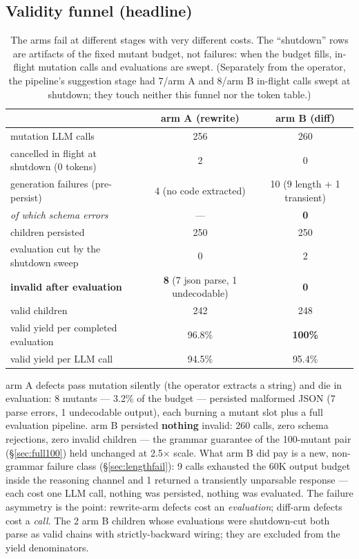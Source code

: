 \documentclass[11pt]{article}
\newcommand{\armA}{\textcolor{bad}{arm A}}
\newcommand{\armB}{\textcolor{accent}{arm B}}
\begin{document}
\subsection{Validity funnel (headline)}
\begin{table}[H]\centering\small
\begin{tabular}{lcc}
\toprule
 & \armA{} (rewrite) & \armB{} (diff) \\
\midrule
mutation LLM calls & 256 & 260 \\
cancelled in flight at shutdown (0 tokens) & 2 & 0 \\
generation failures (pre-persist) & \textcolor{bad}{4} (no code extracted) & \textcolor{bad}{10} (9 length + 1 transient) \\
\quad\emph{of which schema errors} & --- & \textbf{\textcolor{good}{0}} \\
children persisted & 250 & 250 \\
evaluation cut by the shutdown sweep & 0 & 2 \\
\textbf{invalid after evaluation} & \textbf{\textcolor{bad}{8}} (7 json parse, 1 undecodable) & \textbf{\textcolor{good}{0}} \\
valid children & 242 & 248 \\
valid yield per completed evaluation & 96.8\% & \textbf{100\%} \\
valid yield per LLM call & 94.5\% & 95.4\% \\
\bottomrule
\end{tabular}
\caption{The arms fail at different stages with very different costs. The ``shutdown''
rows are artifacts of the fixed mutant budget, not failures: when the budget fills,
in-flight mutation calls and evaluations are swept. (Separately from the operator, the
pipeline's suggestion stage had 7/\armA{} and 8/\armB{} in-flight calls swept at shutdown;
they touch neither this funnel nor the token table.)}
\end{table}
\noindent
\armA{} defects pass mutation silently (the operator extracts a string) and die in
evaluation: 8 mutants --- 3.2\% of the budget --- persisted malformed JSON (7 parse
errors, 1 undecodable output), each burning a mutant slot plus a full evaluation pipeline.
\armB{} persisted \textbf{nothing} invalid: 260 calls, zero schema rejections, zero invalid
children --- the grammar guarantee of the 100-mutant pair (\S\ref{sec:full100}) held
unchanged at 2.5$\times$ scale. What \armB{} did pay is a new, non-grammar failure class
(\S\ref{sec:lengthfail}): 9 calls exhausted the 60K output budget inside the reasoning
channel and 1 returned a transiently unparsable response --- each cost one LLM call,
nothing was persisted, nothing was evaluated. The failure asymmetry is the point:
rewrite-arm defects cost an \emph{evaluation}; diff-arm defects cost a \emph{call}.
The 2 \armB{} children whose evaluations were shutdown-cut both parse as valid chains with
strictly-backward wiring; they are excluded from the yield denominators.
\end{document}
